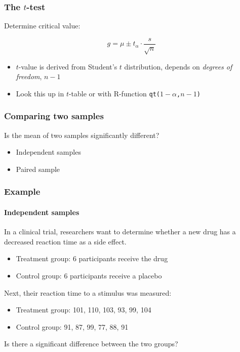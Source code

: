 \documentclass{beamer}
\begin{document}
\begin{frame}
  \frametitle{The $t$-test}
  
  Determine critical value:
  
  \[ g = \mu \pm t_\alpha \cdot \frac{s}{\sqrt{n}} \]
  
  \begin{itemize}
    \item $t$-value is derived from Student's $t$ distribution, depends on \emph{degrees of freedom}, $n-1$
    \item Look this up in $t$-table or with R-function \texttt{qt($1-\alpha$,$n-1$)}
  \end{itemize}
  
\end{frame}

\begin{frame}
  \frametitle{Comparing two samples}
  
  Is the mean of two samples significantly different?
  
  \begin{itemize}
    \item Independent samples
    \item Paired sample
  \end{itemize}
\end{frame}

\begin{frame}
  \frametitle{Example}
  \framesubtitle{Independent samples}
  
  In a clinical trial, researchers want to determine whether a new drug has a decreased reaction time as a side effect.
  
  \begin{itemize}
    \item Treatment group: 6 participants receive the drug
    \item Control group: 6 participants receive a placebo
  \end{itemize}
  
  Next, their reaction time to a stimulus was measured:
  
  \begin{itemize}
    \item Treatment group: 101, 110, 103, 93, 99, 104
    \item Control group: 91, 87, 99, 77, 88, 91
  \end{itemize}
  
  Is there a significant difference between the two groups?
\end{frame}
\end{document}
